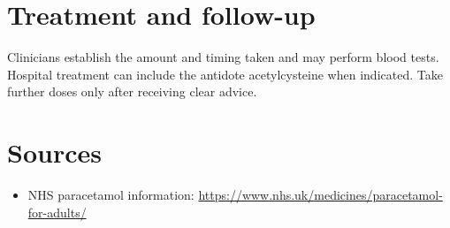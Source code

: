 \section*{Treatment and follow-up}
Clinicians establish the amount and timing taken and may perform blood tests. Hospital treatment can include the antidote acetylcysteine when indicated. Take further doses only after receiving clear advice.

\section*{Sources}
\begin{itemize}
\item NHS paracetamol information: \url{https://www.nhs.uk/medicines/paracetamol-for-adults/}
\end{itemize}
